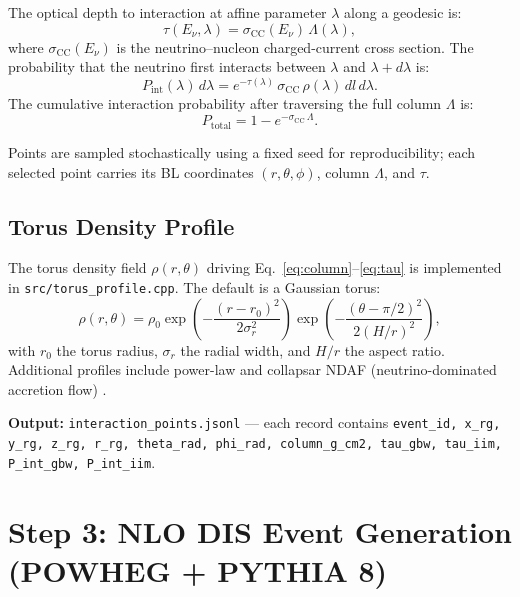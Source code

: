 \documentclass[11pt,a4paper]{article}
\begin{document}
The optical depth to interaction at affine parameter $\lambda$ along a geodesic is:
\begin{equation}
  \tau(E_\nu, \lambda) = \sigma_\mathrm{CC}(E_\nu)\,\Lambda(\lambda),
  \label{eq:tau}
\end{equation}
where $\sigma_\mathrm{CC}(E_\nu)$ is the neutrino--nucleon charged-current cross section. The probability that the neutrino first interacts between $\lambda$ and $\lambda + d\lambda$ is:
\begin{equation}
  P_\mathrm{int}(\lambda)\,d\lambda = e^{-\tau(\lambda)}\,\sigma_\mathrm{CC}\,\rho(\lambda)\,dl\,d\lambda.
  \label{eq:pint}
\end{equation}
The cumulative interaction probability after traversing the full column $\Lambda$ is:
\begin{equation}
  P_\mathrm{total} = 1 - e^{-\sigma_\mathrm{CC}\,\Lambda}.
\end{equation}

Points are sampled stochastically using a fixed seed for reproducibility; each selected point carries its BL coordinates $(r,\theta,\phi)$, column $\Lambda$, and $\tau$.

\subsection{Torus Density Profile}

The torus density field $\rho(r,\theta)$ driving Eq.~\eqref{eq:column}--\eqref{eq:tau} is implemented in \texttt{src/torus\_profile.cpp}. The default is a Gaussian torus:
\begin{equation}
  \rho(r,\theta) = \rho_0 \exp\!\left(-\frac{(r - r_0)^2}{2\sigma_r^2}\right)
                  \exp\!\left(-\frac{(\theta - \pi/2)^2}{2(H/r)^2}\right),
  \label{eq:gaussian_torus}
\end{equation}
with $r_0$ the torus radius, $\sigma_r$ the radial width, and $H/r$ the aspect ratio. Additional profiles include power-law and collapsar NDAF (neutrino-dominated accretion flow) \cite{Popham1999, DiMatteo2002}.

\textbf{Output:} \texttt{interaction\_points.jsonl} --- each record contains \texttt{event\_id, x\_rg, y\_rg, z\_rg, r\_rg, theta\_rad, phi\_rad, column\_g\_cm2, tau\_gbw, tau\_iim, P\_int\_gbw, P\_int\_iim}.

\section{Step 3: NLO DIS Event Generation (POWHEG + PYTHIA 8)}
\label{sec:dis}
\end{document}
